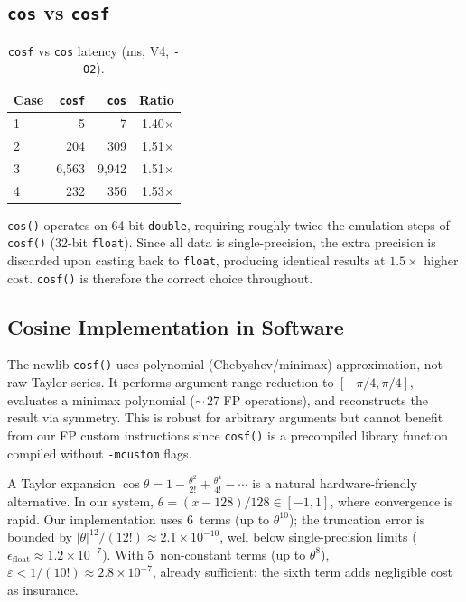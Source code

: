 \documentclass[a4paper,10pt,twocolumn]{article}
\begin{document}
\subsection{\texttt{cos} vs \texttt{cosf}}

\begin{table}[H]
\centering
\caption{\texttt{cosf} vs \texttt{cos} latency (ms, V4, \texttt{-O2}).}
\label{tab:cosvscosf}
\small
\begin{tabular}{lrrr}
\toprule
Case & \texttt{cosf} & \texttt{cos} & Ratio \\
\midrule
1 & 5    & 7    & 1.40$\times$ \\
2 & 204  & 309  & 1.51$\times$ \\
3 & 6{,}563 & 9{,}942 & 1.51$\times$ \\
4 & 232  & 356  & 1.53$\times$ \\
\bottomrule
\end{tabular}
\end{table}

\texttt{cos()} operates on 64-bit \texttt{double}, requiring roughly twice the emulation steps of \texttt{cosf()} (32-bit \texttt{float}).
Since all data is single-precision, the extra precision is discarded upon casting back to \texttt{float}, producing identical results at $1.5\times$ higher cost.
\texttt{cosf()} is therefore the correct choice throughout.

\subsection{Cosine Implementation in Software}
\label{sec:cos_impl}

The newlib \texttt{cosf()} uses polynomial (Chebyshev/minimax) approximation, not raw Taylor series.
It performs argument range reduction to $[-\pi/4, \pi/4]$, evaluates a minimax polynomial (${\sim}\,27$ FP operations), and reconstructs the result via symmetry.
This is robust for arbitrary arguments but cannot benefit from our FP custom instructions since \texttt{cosf()} is a precompiled library function compiled without \texttt{-mcustom} flags.

A Taylor expansion $\cos\theta = 1 - \tfrac{\theta^2}{2!} + \tfrac{\theta^4}{4!} - \cdots$ is a natural hardware-friendly alternative.
In our system, $\theta = (x-128)/128 \in [-1, 1]$, where convergence is rapid.
Our implementation uses 6~terms (up to $\theta^{10}$); the truncation error is bounded by $|\theta|^{12}/(12!) \approx 2.1\!\times\!10^{-10}$, well below single-precision limits ($\epsilon_{\text{float}} \approx 1.2\!\times\!10^{-7}$).
With 5~non-constant terms (up to $\theta^{8}$), $\varepsilon < 1/(10!) \approx 2.8\!\times\!10^{-7}$, already sufficient; the sixth term adds negligible cost as insurance.
\end{document}
